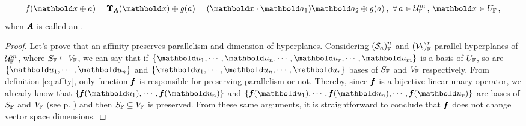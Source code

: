 \begin{equation}
\fua{\mathit{f}}{\vto{x}\oplus a}=\fua{\tnr{\Upsilon}_{\tnr{A}}}{\vto{x}}\oplus\fua{\mathit{g}}{a}=(\vto{x}\cdot\vto{a}_1)\vto{a}_2\oplus\fua{\mathit{g}}{a}\,,\,\,\forall\,a\in\eamd{U}{F}{m}\,,\,\vto{x}\in U_\cam{F}\,,
\end{equation}
when $\tnr{A}$ is called an .


{\footnotesize
\begin{proof}
Let's prove that an affinity preserves parallelism and dimension of hyperplanes. Considering $\eamsd{S}{F}{a}{n}$ and $\eamsd{V}{F}{b}{r}$ parallel hyperplanes of $\eamd{U}{F}{m}$, where $S_\cam{F}\subseteq V_\cam{F}$, we can say that if $\{\vto{u}_1,\cdots,\vto{u}_n,\cdots,\vto{u}_r,\cdots,\vto{u}_m\}$ is a basis of $U_\cam{F}$, so are $\{\vto{u}_1,\cdots,\vto{u}_n\}$ and $\{\vto{u}_1,\cdots,\vto{u}_n,\cdots,\vto{u}_r\}$ bases of $S_\cam{F}$ and $V_\cam{F}$ respectively. From definition \eqref{eq:affty}, only function $\vtf{f}$ is responsible for preserving parallelism or not. Thereby, since $\vtf{f}$ is a bijective linear unary operator, we already know that $\{\fua{\vtf{f}}{\vto{u}_1},\cdots,\fua{\vtf{f}}{\vto{u}_n}\}$ and $\{\fua{\vtf{f}}{\vto{u}_1},\cdots,\fua{\vtf{f}}{\vto{u}_n},\cdots,\fua{\vtf{f}}{\vto{u}_r}\}$ are bases of $S_\cam{F}$ and $V_\cam{F}$ (see p. \pageref{pg:bijecOpe}) and then $S_\cam{F}\subseteq V_\cam{F}$ is preserved. From these same arguments, it is straightforward to conclude that $\vtf{f}$ does not change vector space dimensions.
\end{proof}}


